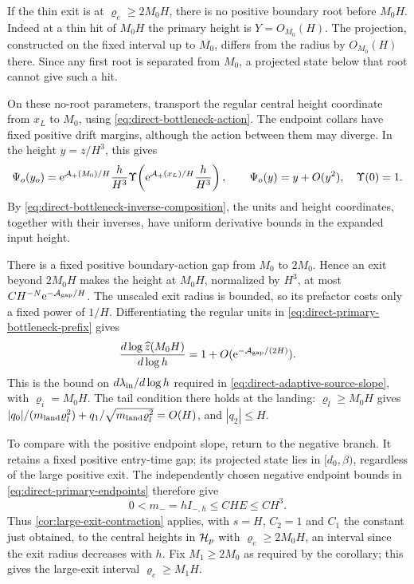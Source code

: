 If the thin exit is at \(\varrho_e\ge2M_0H\), there is no positive
boundary root before \(M_0H\). Indeed at a thin hit of
\(M_0H\) the primary height is \(Y=O_{M_0}(H)\). The
projection, constructed on the fixed interval up to \(M_0\),
differs from the radius by \(O_{M_0}(H)\) there.
Since any first root is separated from \(M_0\), a projected state below
that root cannot give such a hit.

On these no-root parameters, transport the regular central
height coordinate from \(x_L\) to \(M_0\), using
\eqref{eq:direct-bottleneck-action}. The endpoint collars
have fixed positive drift margins, although the action between
them may diverge. In the height \(y=z/H^3\), this gives
\begin{equation}
\label{eq:direct-primary-bottleneck-prefix}
 \Psi_o(y_o)=\mathrm e^{\mathcal A_+(M_0)/H}\frac h{H^3}
 \Upsilon\!\left(\mathrm e^{\mathcal A_+(x_L)/H}\frac h{H^3}\right),
 \qquad \Psi_o(y)=y+O(y^2),\quad \Upsilon(0)=1 .
\end{equation}
By \eqref{eq:direct-bottleneck-inverse-composition}, the units and
height coordinates, together with their inverses, have uniform
derivative bounds in the expanded input height.

There is a fixed positive boundary-action gap from \(M_0\)
to \(2M_0\). Hence an exit beyond \(2M_0H\) makes the
height at \(M_0H\), normalized by \(H^3\), at most
\(C H^{-N}\mathrm e^{-\mathcal A_{\rm gap}/H}\). The unscaled exit radius is
bounded, so its prefactor costs only a fixed power of \(1/H\).
Differentiating the regular units in
\eqref{eq:direct-primary-bottleneck-prefix} gives
\[
 \frac{d\log\widehat z(M_0H)}{d\log h}
             =1+O(\mathrm e^{-\mathcal A_{\rm gap}/(2H)}).
\]
This is the bound on \(d\lambda_{\rm in}/d\log h\) required in
\eqref{eq:direct-adaptive-source-slope}, with \(\varrho_i=M_0H\). The tail
condition there holds at the landing: \(\varrho_l\ge M_0H\) gives
\(|q_0|/(m_{\rm land}\varrho_l^2)+q_1/\sqrt{m_{\rm land}\varrho_l^2}=O(H)\), and
\(|q_2|\le H\).

To compare with the positive endpoint slope, return to the negative
branch. It retains a fixed positive entry-time gap; its projected state lies
in \([d_0,\beta)\), regardless of the large positive exit.
The independently chosen negative endpoint bounds in
\eqref{eq:direct-primary-endpoints} therefore give
\[
 0<m_-=hI_{-,h}\le CHE\le CH^3 .
\]
Thus \cref{cor:large-exit-contraction} applies, with \(s=H\), \(C_2=1\)
and \(C_1\) the constant just obtained, to the central heights in
\(\mathcal H_p\) with \(\varrho_e\ge2M_0H\), an interval since the exit radius
decreases with \(h\). Fix \(M_1\ge2M_0\) as required by the corollary; this gives the
large-exit interval \(\varrho_e\ge M_1H\).

